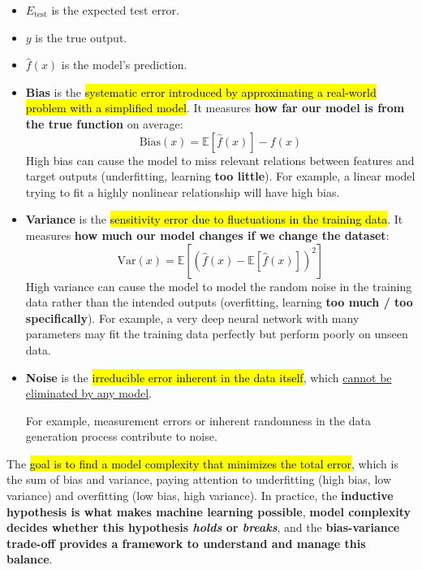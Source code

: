 \begin{itemize}
    \item $E_{\text{test}}$ is the expected test error.
    
    
    \item $y$ is the true output.
    
    
    \item $\hat{f}(x)$ is the model's prediction.
    
    
    \item \textbf{Bias} is the \hl{systematic error introduced by approximating a real-world problem with a simplified model}. It measures \textbf{how far our model is from the true function} on average:
    \begin{equation*}
        \text{Bias}(x) = \mathbb{E}\left[\hat{f}(x)\right] - f(x)
    \end{equation*}
    High bias can cause the model to miss relevant relations between features and target outputs (underfitting, learning \textbf{too little}). For example, a linear model trying to fit a highly nonlinear relationship will have high bias.
    
    
    \item \textbf{Variance} is the \hl{sensitivity error due to fluctuations in the training data}. It measures \textbf{how much our model changes if we change the dataset}:
    \begin{equation*}
        \text{Var}(x) = \mathbb{E}\left[\left(\hat{f}(x) - \mathbb{E}\left[\hat{f}(x)\right]\right)^{2}\right]
    \end{equation*}
    High variance can cause the model to model the random noise in the training data rather than the intended outputs (overfitting, learning \textbf{too much / too specifically}). For example, a very deep neural network with many parameters may fit the training data perfectly but perform poorly on unseen data.
    
    
    \item \textbf{Noise} is the \hl{irreducible error inherent in the data itself}, which \underline{cannot be} \underline{eliminated by any model}.
    
    For example, measurement errors or inherent randomness in the data generation process contribute to noise.
\end{itemize}
The \hl{goal is to find a model complexity that minimizes the total error}, which is the sum of bias and variance, paying attention to underfitting (high bias, low variance) and overfitting (low bias, high variance). In practice, the \textbf{inductive hypothesis is what makes machine learning possible}, \textbf{model complexity decides whether this hypothesis \emph{holds} or \emph{breaks}}, and the \textbf{bias-variance trade-off provides a framework to understand and manage this balance}.

